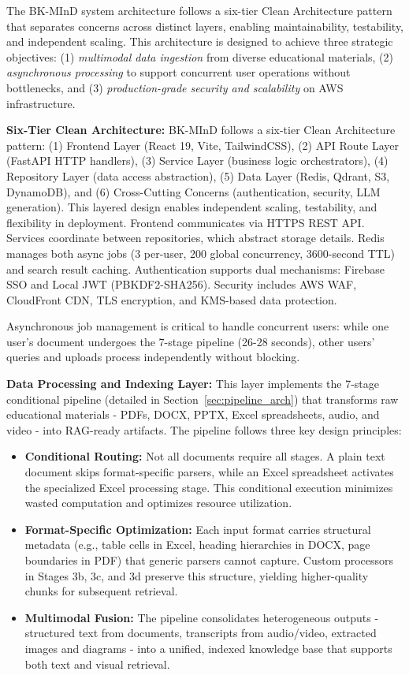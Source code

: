 The BK-MInD system architecture follows a six-tier Clean Architecture pattern that separates concerns across distinct layers, enabling maintainability, testability, and independent scaling. This architecture is designed to achieve three strategic objectives: (1) \textit{multimodal data ingestion} from diverse educational materials, (2) \textit{asynchronous processing} to support concurrent user operations without bottlenecks, and (3) \textit{production-grade security and scalability} on AWS infrastructure.

\textbf{Six-Tier Clean Architecture:} BK-MInD follows a six-tier Clean Architecture pattern: (1) Frontend Layer (React 19, Vite, TailwindCSS), (2) API Route Layer (FastAPI HTTP handlers), (3) Service Layer (business logic orchestrators), (4) Repository Layer (data access abstraction), (5) Data Layer (Redis, Qdrant, S3, DynamoDB), and (6) Cross-Cutting Concerns (authentication, security, LLM generation). This layered design enables independent scaling, testability, and flexibility in deployment. Frontend communicates via HTTPS REST API. Services coordinate between repositories, which abstract storage details. Redis manages both async jobs (3 per-user, 200 global concurrency, 3600-second TTL) and search result caching. Authentication supports dual mechanisms: Firebase SSO and Local JWT (PBKDF2-SHA256). Security includes AWS WAF, CloudFront CDN, TLS encryption, and KMS-based data protection.

Asynchronous job management is critical to handle concurrent users: while one user's document undergoes the 7-stage pipeline (26-28 seconds), other users' queries and uploads process independently without blocking.

\textbf{Data Processing and Indexing Layer:} This layer implements the 7-stage conditional pipeline (detailed in Section~\ref{sec:pipeline_arch}) that transforms raw educational materials - PDFs, DOCX, PPTX, Excel spreadsheets, audio, and video - into RAG-ready artifacts. The pipeline follows three key design principles:

\begin{itemize}
    \item \textbf{Conditional Routing:} Not all documents require all stages. A plain text document skips format-specific parsers, while an Excel spreadsheet activates the specialized Excel processing stage. This conditional execution minimizes wasted computation and optimizes resource utilization.

    \item \textbf{Format-Specific Optimization:} Each input format carries structural metadata (e.g., table cells in Excel, heading hierarchies in DOCX, page boundaries in PDF) that generic parsers cannot capture. Custom processors in Stages 3b, 3c, and 3d preserve this structure, yielding higher-quality chunks for subsequent retrieval.

    \item \textbf{Multimodal Fusion:} The pipeline consolidates heterogeneous outputs - structured text from documents, transcripts from audio/video, extracted images and diagrams - into a unified, indexed knowledge base that supports both text and visual retrieval.
\end{itemize}


